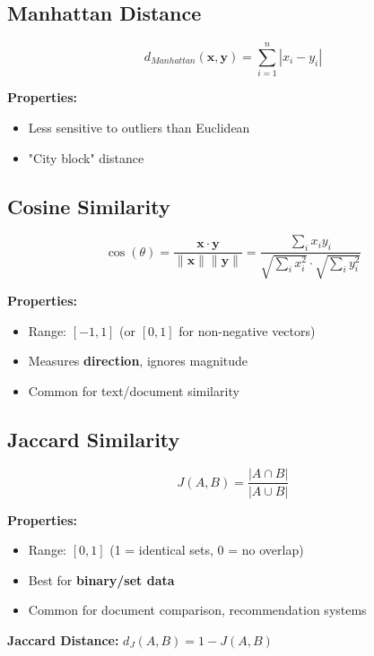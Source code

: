 \subsection{Manhattan Distance}

\begin{formulabox}
\[
d_{Manhattan}(\mathbf{x}, \mathbf{y}) = \sum_{i=1}^{n} |x_i - y_i|
\]

\textbf{Properties:}
\begin{itemize}
    \item Less sensitive to outliers than Euclidean
    \item "City block" distance
\end{itemize}
\end{formulabox}

\subsection{Cosine Similarity}

\begin{formulabox}
\[
\cos(\theta) = \frac{\mathbf{x} \cdot \mathbf{y}}{\|\mathbf{x}\| \|\mathbf{y}\|} = \frac{\sum_i x_i y_i}{\sqrt{\sum_i x_i^2} \cdot \sqrt{\sum_i y_i^2}}
\]

\textbf{Properties:}
\begin{itemize}
    \item Range: $[-1, 1]$ (or $[0, 1]$ for non-negative vectors)
    \item Measures \textbf{direction}, ignores magnitude
    \item Common for text/document similarity
\end{itemize}
\end{formulabox}

\subsection{Jaccard Similarity}

\begin{formulabox}
\[
J(A, B) = \frac{|A \cap B|}{|A \cup B|}
\]

\textbf{Properties:}
\begin{itemize}
    \item Range: $[0, 1]$ (1 = identical sets, 0 = no overlap)
    \item Best for \textbf{binary/set data}
    \item Common for document comparison, recommendation systems
\end{itemize}

\textbf{Jaccard Distance:} $d_J(A, B) = 1 - J(A, B)$
\end{formulabox}

